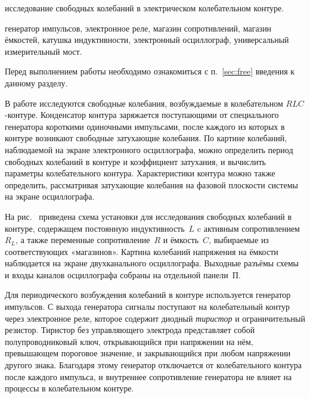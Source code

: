 
\begin{lab:aim}
исследование свободных колебаний в электрическом колебательном контуре.
\end{lab:aim}

\begin{lab:equipment}
генератор импульсов, электронное реле, магазин сопротивлений, магазин ёмкостей, 
катушка индуктивности, электронный осциллограф, универсальный измерительный мост.
\end{lab:equipment}

Перед выполнением работы необходимо ознакомиться с п.~\ref{sec:free}
введения к данному разделу.

В работе исследуются свободные колебания, возбуждаемые в колебательном $RLC$-контуре. 
Конденсатор контура заряжается поступающими от специального генератора короткими 
одиночными импульсами, после каждого из которых в контуре возникают свободные 
затухающие колебания. По картине колебаний, наблюдаемой на экране электронного осциллографа,
можно определить период свободных колебаний в контуре и коэффициент затухания,
и вычислить параметры колебательного контура. Характеристики контура 
можно также определить, рассматривая затухающие колебания на фазовой плоскости системы 
на экране осциллографа.

\experiment 


На рис.~ приведена схема установки для исследования свободных колебаний в контуре, 
содержащем постоянную индуктивность~$L$ c активным сопротивлением~$R_L$, 
а также переменные сопротивление~$R$ и ёмкость~$C$, 
выбираемые из соответствующих «магазинов». Картина колебаний напряжения 
на ёмкости наблюдается на экране двухканального осциллографа.
Выходные разъёмы схемы и входы каналов осциллографа собраны на 
отдельной панели~П.

Для периодического возбуждения колебаний в контуре используется генератор 
импульсов. С выхода генератора сигналы поступают на колебательный контур 
через электронное реле, которое содержит диодный \emph{тиристор} и ограничительный 
резистор. Тиристор без управляющего электрода представляет собой 
полупроводниковый ключ, открывающийся при напряжении на нём, превышающем 
пороговое значение, и закрывающийся при любом напряжении другого знака. 
Благодаря этому генератор отключается от колебательного контура после каждого 
импульса, и внутреннее сопротивление генератора не влияет на процессы 
в колебательном контуре.

